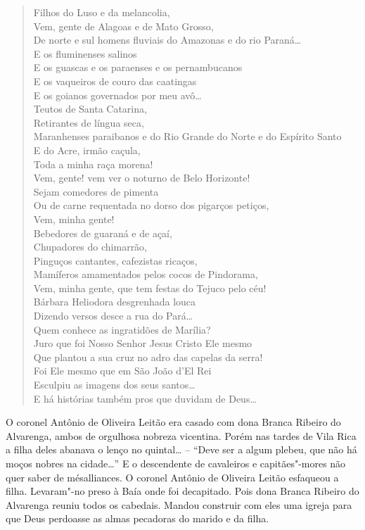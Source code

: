 {\begin{verse}
Filhos do Luso e da melancolia,\\
Vem, gente de Alagoas e de Mato Grosso,\\
De norte e sul homens fluviais do Amazonas e do rio Paraná\ldots{}\\
E os fluminenses salinos\\
E os guascas e os paraenses e os pernambucanos\\
E os vaqueiros de couro das caatingas\\
E os goianos governados por meu avô\ldots{}\\
Teutos de Santa Catarina,\\
Retirantes de língua seca,\\
Maranhenses paraibanos e do Rio Grande do Norte e do Espírito Santo\\
E do Acre, irmão caçula,\\
Toda a minha raça morena!\\
Vem, gente! vem ver o noturno de Belo Horizonte!\\
Sejam comedores de pimenta\\
Ou de carne requentada no dorso dos pigarços petiços,\\
Vem, minha gente!\\
Bebedores de guaraná e de açaí,\\
Chupadores do chimarrão,\\
Pinguços cantantes, cafezistas ricaços,\\
Mamíferos amamentados pelos cocos de Pindorama,\\
Vem, minha gente, que tem festas do Tejuco pelo céu!\\
Bárbara Heliodora desgrenhada louca\\
Dizendo versos desce a rua do Pará\ldots{}\\
Quem conhece as ingratidões de Marília?\\
Juro que foi Nosso Senhor Jesus Cristo Ele mesmo\\
Que plantou a sua cruz no adro das capelas da serra!\\
Foi Ele mesmo que em São João d’El Rei\\
Esculpiu as imagens dos seus santos\ldots{}\\
E há histórias também pros que duvidam de Deus\ldots{}\\
\end{verse}

\parbox{\textwidth}{
O coronel Antônio de Oliveira Leitão era casado com dona Branca Ribeiro
do Alvarenga, ambos de orgulhosa nobreza vicentina. Porém nas tardes de
Vila Rica a filha deles abanava o lenço no quintal\ldots{} -- ``Deve ser a
algum plebeu, que não há moços nobres na cidade\ldots{}'' E o descendente de
cavaleiros e capitães"-mores não quer saber de mésalliances. O coronel
Antônio de Oliveira Leitão esfaqueou a filha. Levaram"-no preso à Baía
onde foi decapitado. Pois dona Branca Ribeiro do Alvarenga reuniu todos
os cabedais. Mandou construir com eles uma igreja para que Deus
perdoasse as almas pecadoras do marido e da filha.}

}
